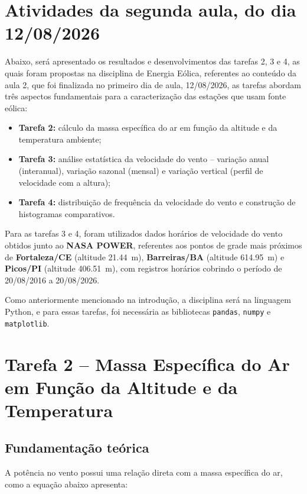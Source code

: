 \documentclass[11pt,a4paper]{article}
\begin{document}
\section{Atividades da segunda aula, do dia 12/08/2026}
Abaixo, será apresentado os resultados e desenvolvimentos das tarefas 2, 3 e 4, as quais foram propostas na disciplina de Energia Eólica, referentes ao conteúdo da aula 2, que foi finalizada no primeiro dia de aula, 12/08/2026, as tarefas abordam três aspectos fundamentais para a caracterização das estações que usam fonte eólica:

\begin{itemize}
    \item \textbf{Tarefa 2:} cálculo da massa específica do ar em função
    da altitude e da temperatura ambiente;
    \item \textbf{Tarefa 3:} análise estatística da velocidade do vento --
    variação anual (interanual), variação sazonal (mensal) e
    variação vertical (perfil de velocidade com a altura);
    \item \textbf{Tarefa 4:} distribuição de frequência da velocidade
    do vento e construção de histogramas comparativos.
\end{itemize}
Para as tarefas 3 e 4, foram utilizados dados horários de velocidade do
vento obtidos junto ao \textbf{NASA POWER}, referentes
aos pontos de grade mais próximos de \textbf{Fortaleza/CE} (altitude
\SI{21.44}{\meter}), \textbf{Barreiras/BA} (altitude
\SI{614.95}{\meter}) e \textbf{Picos/PI} (altitude
\SI{406.51}{\meter}), com registros horários cobrindo o período de
20/08/2016 a 20/08/2026.

Como anteriormente mencionado na introdução, a disciplina será na linguagem Python, e para essas tarefas, foi necessária as bibliotecas \texttt{pandas}, \texttt{numpy} e \texttt{matplotlib}.

\newpage


\section{Tarefa 2 -- Massa Específica do Ar em Função da Altitude e
da Temperatura}

\subsection{Fundamentação teórica}
A potência no vento possui uma relação direta com a massa específica do ar, como a equação abaixo apresenta:
\end{document}
